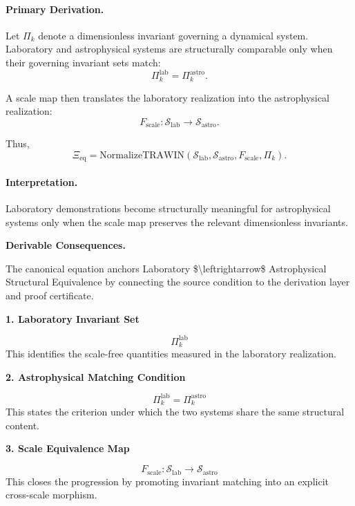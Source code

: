 \paragraph{Primary Derivation.}
Let $\Pi_k$ denote a dimensionless invariant governing a dynamical system.  
Laboratory and astrophysical systems are structurally comparable only when their governing invariant sets match:
\begin{equation}
\Pi_k^{\mathrm{lab}}
=
\Pi_k^{\mathrm{astro}} .
\end{equation}

A scale map then translates the laboratory realization into the astrophysical realization:
\begin{equation}
F_{\mathrm{scale}}:
\mathcal{S}_{\mathrm{lab}}
\to
\mathcal{S}_{\mathrm{astro}} .
\end{equation}

Thus,
\begin{equation}
\boxed{
\Xi_{\mathrm{eq}}
=
\mathrm{NormalizeTRAWIN}
\left(
\mathcal{S}_{\mathrm{lab}},
\mathcal{S}_{\mathrm{astro}},
F_{\mathrm{scale}},
\Pi_k
\right).
}
\end{equation}

\paragraph{Interpretation.}
Laboratory demonstrations become structurally meaningful for astrophysical systems only when the scale map preserves the relevant dimensionless invariants.

\par\vspace{0.35em}
\noindent\textbf{Derivable Consequences.}\quad
\begingroup
\footnotesize
\raggedright
The canonical equation anchors Laboratory \$\textbackslash{}leftrightarrow\$ Astrophysical Structural Equivalence by connecting the source condition to the derivation layer and proof certificate.
\par\endgroup

\noindent\textbf{1. Laboratory Invariant Set}\par
\[
\Pi_{k}^{\mathrm{lab}}
\]
\noindent This identifies the scale-free quantities measured in the laboratory realization.\par
\noindent\textbf{2. Astrophysical Matching Condition}\par
\[
\Pi_{k}^{\mathrm{lab}} = \Pi_{k}^{\mathrm{astro}}
\]
\noindent This states the criterion under which the two systems share the same structural content.\par
\noindent\textbf{3. Scale Equivalence Map}\par
\[
F_{\mathrm{scale}} : \mathcal{S}_{\mathrm{lab}} \longrightarrow \mathcal{S}_{\mathrm{astro}}
\]
\noindent This closes the progression by promoting invariant matching into an explicit cross-scale morphism.\par

